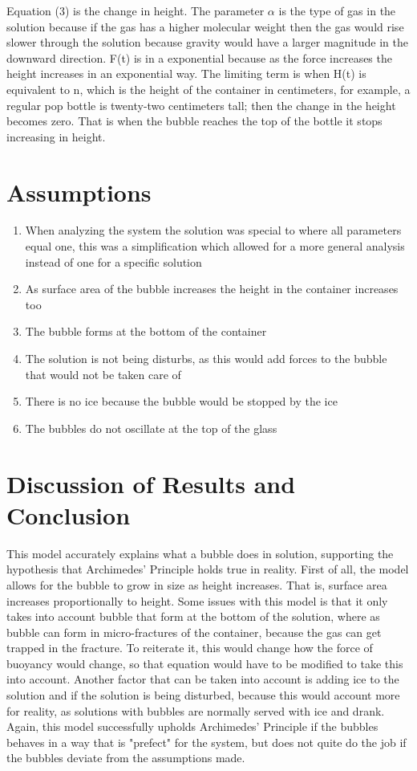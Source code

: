 \documentclass[11pt]{article}
\begin{document}
\indent Equation (3) is the change in height. The parameter $\alpha$ is the type of gas in the solution because if the gas has a higher molecular weight then the gas would rise slower through the solution because gravity would have a larger magnitude in the downward direction. F(t) is in a exponential because as the force increases the height increases in an exponential way. The limiting term is when H(t) is equivalent to n, which is the height of the container in centimeters, for example, a regular pop bottle is twenty-two centimeters tall; then the change in the height becomes zero. That is when the bubble reaches the top of the bottle it stops increasing in height.   \\
\section{Assumptions} \hfill\break
\begin{enumerate}
  \item When analyzing the system the solution was special to where all parameters equal one, this was a simplification which allowed for a more general analysis instead of one for a specific solution  
  \item As surface area of the bubble increases the height in the container increases too
  \item The bubble forms at the bottom of the container 
  \item The solution is not being disturbs, as this would add forces to the bubble that would not be taken care of 
  \item There is no ice because the bubble would be stopped by the ice
  \item The bubbles do not oscillate at the top of the glass 
\end{enumerate}
 \hfill\break
\section{Discussion of Results and Conclusion} \hfill\break
\indent This model accurately explains what a bubble does in solution, supporting the hypothesis that Archimedes' Principle holds true in reality. First of all, the model allows for the bubble to grow in size as height increases. That is, surface area increases proportionally to height. Some issues with this model is that it only takes into account bubble that form at the bottom of the solution, where as bubble can form in micro-fractures of the container, because the gas can get trapped in the fracture. To reiterate it, this would change how the force of buoyancy would change, so that equation would have to be modified to take this into account. Another factor that can be taken into account is adding ice to the solution and if the solution is being disturbed, because this would account more for reality, as solutions with bubbles are normally served with ice and drank. Again, this model successfully upholds Archimedes' Principle if the bubbles behaves in a way that is "prefect" for the system, but does not quite do the job if the bubbles deviate from the assumptions made. \\
\end{document}
